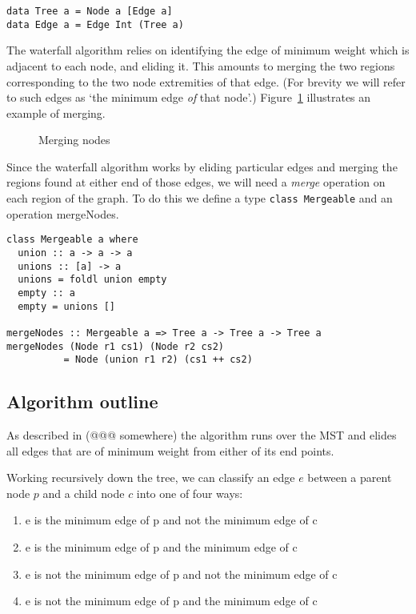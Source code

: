 \documentclass{jfp}
\begin{document}
\begin{verbatim}
data Tree a = Node a [Edge a]
data Edge a = Edge Int (Tree a)
\end{verbatim}


The waterfall algorithm relies on identifying the edge of minimum
weight which is adjacent to each node, and eliding it. This amounts to
merging the two regions corresponding to the two node extremities of
that edge.  (For brevity we will refer to such edges as `the minimum
edge {\em of\/} that node'.) Figure~\ref{fig:merging} illustrates an
example of merging.

\begin{figure}
\centering
\ifpdf
\else
\fi
\caption{Merging nodes}
\label{fig:merging}
\end{figure}

Since the waterfall algorithm works by eliding particular edges and
merging the regions found at either end of those edges, we will need a
{\em merge} operation on each region of the graph. To do this we
define a type {\tt class Mergeable} and an operation mergeNodes.

\begin{verbatim}
class Mergeable a where
  union :: a -> a -> a
  unions :: [a] -> a
  unions = foldl union empty
  empty :: a
  empty = unions []

mergeNodes :: Mergeable a => Tree a -> Tree a -> Tree a
mergeNodes (Node r1 cs1) (Node r2 cs2)
          = Node (union r1 r2) (cs1 ++ cs2)
\end{verbatim}


\subsection{Algorithm outline}

As described in (@@@ somewhere) the algorithm runs over the MST and
elides all edges that are of minimum weight from either of its end
points.

Working recursively down the tree, we can classify an edge $e$ between
a parent node $p$ and a child node $c$ into one of four ways:
\begin{enumerate}[I]
\item e is     the minimum edge of p and not the minimum edge of c
\item e is     the minimum edge of p and     the minimum edge of c
\item e is not the minimum edge of p and not the minimum edge of c
\item e is not the minimum edge of p and     the minimum edge of c
\end{enumerate}
\end{document}
